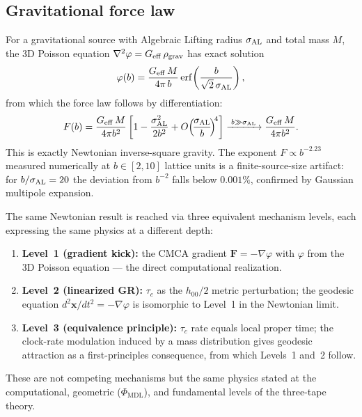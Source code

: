 \documentclass[11pt]{article}
\theoremstyle{remark}
\newcommand{\PHIMDL}{\Phi_{\mathrm{MDL}}}
\begin{document}
\subsection{Gravitational force law}
\label{ssec:force_law}

For a gravitational source with Algebraic Lifting radius $\sigma_{\rm AL}$ and
total mass $M$, the 3D Poisson equation $\nabla^2\varphi = G_{\rm eff}\,\rho_{\rm grav}$
has exact solution
\begin{equation}
\label{eq:phi_erf}
  \varphi(b) = \frac{G_{\rm eff}\,M}{4\pi\,b}\,
  \mathrm{erf}\!\left(\frac{b}{\sqrt{2}\,\sigma_{\rm AL}}\right),
\end{equation}
from which the force law follows by differentiation:
\begin{equation}
\label{eq:force_law}
  F(b) = \frac{G_{\rm eff}\,M}{4\pi b^2}
  \left[1 - \frac{\sigma_{\rm AL}^2}{2b^2}
  + O\!\left(\!\frac{\sigma_{\rm AL}}{b}\!\right)^{\!4}\right]
  \xrightarrow{\;b\gg\sigma_{\rm AL}\;}
  \frac{G_{\rm eff}\,M}{4\pi b^2}.
\end{equation}
This is exactly Newtonian inverse-square gravity. The exponent $F\propto b^{-2.23}$
measured numerically at $b\in[2,10]$ lattice units is a finite-source-size artifact:
for $b/\sigma_{\rm AL} = 20$ the deviation from $b^{-2}$ falls below $0.001\%$,
confirmed by Gaussian multipole expansion.

The same Newtonian result is reached via three equivalent mechanism levels, each
expressing the same physics at a different depth:
\begin{enumerate}[label=(\arabic*),itemsep=2pt]
\item \textbf{Level~1 (gradient kick):} the CMCA gradient $\mathbf{F} = -\nabla\varphi$
      with $\varphi$ from the 3D Poisson equation --- the direct computational realization.
\item \textbf{Level~2 (linearized GR):} $\tau_c$ as the $h_{00}/2$ metric perturbation;
      the geodesic equation $d^2\mathbf{x}/dt^2 = -\nabla\varphi$ is isomorphic to
      Level~1 in the Newtonian limit.
\item \textbf{Level~3 (equivalence principle):} $\tau_c$ rate equals local proper time;
      the clock-rate modulation induced by a mass distribution gives geodesic attraction
      as a first-principles consequence, from which Levels~1 and~2 follow.
\end{enumerate}
These are not competing mechanisms but the same physics stated at the computational,
geometric ($\PHIMDL$), and fundamental levels of the three-tape theory.
\end{document}
